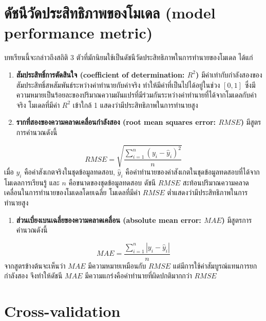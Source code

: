 \documentclass[
]{article}
\providecommand{\tightlist}{%
  \setlength{\itemsep}{0pt}\setlength{\parskip}{0pt}}
\begin{document}
\hypertarget{uxe14uxe31uxe0auxe19uxe35uxe27uxe31uxe14uxe1buxe23uxe30uxe2auxe34uxe17uxe18uxe34uxe20uxe32uxe1euxe02uxe2duxe07uxe42uxe21uxe40uxe14uxe25-model-performance-metric}{%
\section{\texorpdfstring{\textbf{ดัชนีวัดประสิทธิภาพของโมเดล (model
performance
metric)}}{ดัชนีวัดประสิทธิภาพของโมเดล (model performance metric)}}\label{uxe14uxe31uxe0auxe19uxe35uxe27uxe31uxe14uxe1buxe23uxe30uxe2auxe34uxe17uxe18uxe34uxe20uxe32uxe1euxe02uxe2duxe07uxe42uxe21uxe40uxe14uxe25-model-performance-metric}}

บทเรียนนี้จะกล่าวถึงสถิติ 3
ตัวที่มักนิยมใช้เป็นดัชนีวัดประสิทธิภาพในการทำนายของโมเดล ได้แก่

\begin{enumerate}
\def\labelenumi{\arabic{enumi}.}
\item
  \textbf{สัมประสิทธิ์การตัดสินใจ (coefficient of determination:
  \(R^2\))}
  มีค่าเท่ากับกำลังสองของสัมประสิทธิ์สหสัมพันธ์ระหว่างค่าทำนายกับค่าจริง
  ทำให้มีค่าที่เป็นไปได้อยู่ในช่วง \([0,1]\)
  ซึ่งมีความหมายเป็นร้อยละของปริมาณความผันแปรที่มีร่วมกันระหว่างค่าทำนายที่ได้จากโมเดลกับค่าจริง
  โมเดลที่มีค่า \(R^2\) เข้าใกล้ 1 แสดงว่ามีประสิทธิภาพในการทำนายสูง
\item
  \textbf{รากที่สองของความคลาดเคลื่อนกำลังสอง (root mean squares error:
  \(RMSE\))} มีสูตรการคำนวณดังนี้
\end{enumerate}

\[RMSE=\sqrt{\frac{\sum_{i=1}^n(y_i-\hat{y}_i)^2}{n}}\] เมื่อ \(y_i\)
คือค่าสังเกตจริงในชุดข้อมูลทดสอบ, \(\hat{y}_i\)
คือค่าทำนายของค่าสังเกตในชุดข้อมูลทดสอบที่ได้จากโมเดลการเรียนรู้ และ
\(n\) คือขนาดของชุดข้อมูลทดสอบ ดัชนี \(RMSE\)
สะท้อนปริมาณความคลาดเคลื่อนในการทำนายของโมเดลโดยเฉลี่ย โมเดลที่มีค่า
\(RMSE\) ต่ำแสดงว่ามีประสิทธิภาพในการทำนายสูง

\begin{enumerate}
\def\labelenumi{\arabic{enumi}.}
\setcounter{enumi}{2}
\tightlist
\item
  \textbf{ส่วนเบี่ยงเบนเฉลี่ยของความคลาดเคลื่อน (absolute mean error:
  \(MAE\))} มีสูตรการคำนวณดังนี้
\end{enumerate}

\[MAE=\frac{\sum_{i=1}^n|y_i-\hat{y}_i|}{n}\] จากสูตรข้างต้นจะเห็นว่า
\(MAE\) มีความหมายเหมือนกับ \(RMSE\)
แต่มีการใช้ค่าสัมบูรณ์แทนการยกกำลังสอง จึงทำให้ดัชนี \(MAE\)
มีความแกร่งคือค่าทำนายที่ผิดปกติมากกว่า \(RMSE\)

\hypertarget{cross-validation}{%
\section{\texorpdfstring{\textbf{Cross-validation}}{Cross-validation}}\label{cross-validation}}
\end{document}
